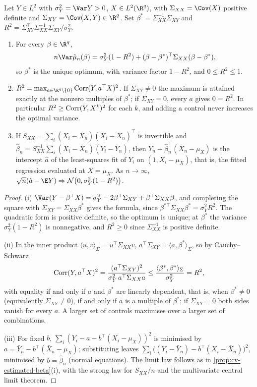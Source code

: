 \begin{theorem}\label{thm:cv-multiple}
Let $Y\in L^2$ with $\sigma_Y^2=\Var Y>0$, $X\in L^2(\R^q)$, with $\Sigma_{XX}=\Cov(X)$ positive definite and
$\Sigma_{XY}=\Cov(X,Y)\in\R^q$. Set
$\beta^*=\Sigma_{XX}^{-1}\Sigma_{XY}$ and $R^2=\Sigma_{XY}^\top\Sigma_{XX}^{-1}\Sigma_{XY}/\sigma_Y^2$.
\begin{enumerate}[label=(\roman*)]
  \item For every $\beta\in\R^q$,
    \[
      n\Var\hat\mu_n(\beta)=\sigma_Y^2(1-R^2)+(\beta-\beta^*)^\top\Sigma_{XX}(\beta-\beta^*),
    \]
    so $\beta^*$ is the unique optimum, with variance factor $1-R^2$, and $0\le R^2\le1$.
  \item $R^2=\max_{a\in\R^q\setminus\{0\}}\Corr(Y,a^\top X)^2$. If $\Sigma_{XY}\ne0$ the maximum
    is attained exactly at the nonzero multiples of $\beta^*$; if $\Sigma_{XY}=0$, every $a$ gives
    $0=R^2$. In particular $R^2\ge\operatorname{Corr}(Y,X^k)^2$ for each $k$, and adding a control never increases the
    optimal variance.
  \item If $S_{XX}=\sum_i(X_i-\bar X_n)(X_i-\bar X_n)^\top$ is invertible and
    $\hat\beta_n=S_{XX}^{-1}\sum_i(X_i-\bar X_n)(Y_i-\bar Y_n)$, then
    $\bar Y_n-\hat\beta_n^\top(\bar X_n-\mu_X)$ is the intercept $\hat a$ of the
    least-squares fit of $Y_i$ on $(1,X_i-\mu_X)$, that is, the fitted regression evaluated
    at $X=\mu_X$. As $n\to\infty$,
    $\sqrt n(\hat a-\E Y)\Rightarrow\mathcal N\big(0,\sigma_Y^2(1-R^2)\big)$.
\end{enumerate}
\end{theorem}

\begin{proof}
(i) $\Var(Y-\beta^\top X)=\sigma_Y^2-2\beta^\top\Sigma_{XY}+\beta^\top\Sigma_{XX}\beta$, and
completing the square with $\Sigma_{XY}=\Sigma_{XX}\beta^*$ gives the formula, since
$\beta^{*\top}\Sigma_{XX}\beta^*=\sigma_Y^2R^2$. The quadratic form is positive definite, so
the optimum is unique; at $\beta^*$ the variance $\sigma_Y^2(1-R^2)$ is nonnegative, and
$R^2\ge0$ since $\Sigma_{XX}^{-1}$ is positive definite.

(ii) In the inner product $\langle u,v\rangle_\Sigma=u^\top\Sigma_{XX}v$,
$a^\top\Sigma_{XY}=\langle a,\beta^*\rangle_\Sigma$, so by Cauchy--Schwarz
\[
  \operatorname{Corr}(Y,a^\top X)^2=\frac{(a^\top\Sigma_{XY})^2}{\sigma_Y^2\,a^\top\Sigma_{XX}a}
  \le\frac{\langle\beta^*,\beta^*\rangle_\Sigma}{\sigma_Y^2}=R^2,
\]
with equality if and only if $a$ and $\beta^*$ are linearly dependent, that is, when
$\beta^*\ne0$ (equivalently $\Sigma_{XY}\ne0$), if and only if $a$ is a multiple of $\beta^*$; if
$\Sigma_{XY}=0$ both sides vanish for every $a$. A larger set of controls maximises over a larger
set of combinations.

(iii) For fixed $b$, $\sum_i(Y_i-a-b^\top(X_i-\mu_X))^2$ is minimised by
$a=\bar Y_n-b^\top(\bar X_n-\mu_X)$; substituting leaves
$\sum_i\big((Y_i-\bar Y_n)-b^\top(X_i-\bar X_n)\big)^2$, minimised by $b=\hat\beta_n$ (normal
equations). The limit law follows as in \cref{prop:cv-estimated-beta}(i), with the strong law
for $S_{XX}/n$ and the multivariate central limit theorem.
\end{proof}

